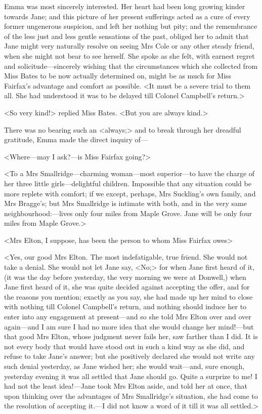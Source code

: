Emma was most sincerely interested. Her heart had been long growing kinder towards Jane; and this picture of her present sufferings acted as a cure of every former ungenerous suspicion, and left her nothing but pity; and the remembrance of the less just and less gentle sensations of the past, obliged her to admit that Jane might very naturally resolve on seeing Mrs Cole or any other steady friend, when she might not bear to see herself. She spoke as she felt, with earnest regret and solicitude—sincerely wishing that the circumstances which she collected from Miss Bates to be now actually determined on, might be as much for Miss Fairfax's advantage and comfort as possible. <It must be a severe trial to them all. She had understood it was to be delayed till Colonel Campbell's return.>

<So very kind!> replied Miss Bates. <But you are always kind.>

There was no bearing such an <always;> and to break through her dreadful gratitude, Emma made the direct inquiry of—

<Where—may I ask?—is Miss Fairfax going?>

<To a Mrs Smallridge—charming woman—most superior—to have the charge of her three little girls—delightful children. Impossible that any situation could be more replete with comfort; if we except, perhaps, Mrs Suckling's own family, and Mrs Bragge's; but Mrs Smallridge is intimate with both, and in the very same neighbourhood:—lives only four miles from Maple Grove. Jane will be only four miles from Maple Grove.>

<Mrs Elton, I suppose, has been the person to whom Miss Fairfax owes\longdash>

<Yes, our good Mrs Elton. The most indefatigable, true friend. She would not take a denial. She would not let Jane say, <No;> for when Jane first heard of it, (it was the day before yesterday, the very morning we were at Donwell,) when Jane first heard of it, she was quite decided against accepting the offer, and for the reasons you mention; exactly as you say, she had made up her mind to close with nothing till Colonel Campbell's return, and nothing should induce her to enter into any engagement at present—and so she told Mrs Elton over and over again—and I am sure I had no more idea that she would change her mind!—but that good Mrs Elton, whose judgment never fails her, saw farther than I did. It is not every body that would have stood out in such a kind way as she did, and refuse to take Jane's answer; but she positively declared she would not write any such denial yesterday, as Jane wished her; she would wait—and, sure enough, yesterday evening it was all settled that Jane should go. Quite a surprize to me! I had not the least idea!—Jane took Mrs Elton aside, and told her at once, that upon thinking over the advantages of Mrs Smallridge's situation, she had come to the resolution of accepting it.—I did not know a word of it till it was all settled.>

